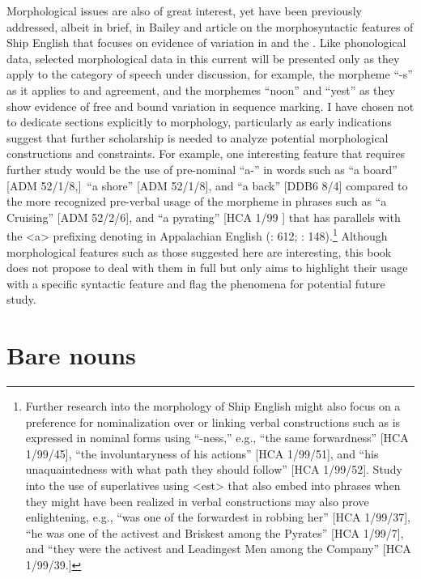 Morphological issues are also of great interest, yet have been previously addressed, albeit in brief, in Bailey and  article on the morphosyntactic features of Ship English that focuses on evidence of variation in  and the . Like phonological data, selected morphological data in this current  will be presented only as they apply to the category of speech under discussion, for example, the morpheme “-s” as it applies to  and   agreement, and the morphemes “noon” and “yest” as they show evidence of free and bound variation in sequence marking. I have chosen not to dedicate sections explicitly to morphology, particularly as early indications suggest that further scholarship is needed to analyze potential morphological constructions and constraints. For example, one interesting feature that requires further study would be the use of pre-nominal “a-” in words such as “a board” [ADM 52/1/8,]~“a shore” [ADM 52/1/8], and “a back” [DDB6 8/4] compared to the more recognized pre-verbal usage of the morpheme in phrases such as “a Cruising” [ADM 52/2/6], and “a pyrating” [HCA 1/99 \citealt{Barbados1733}] that has parallels with the <a> prefixing denoting  in Appalachian English (\citealt{Hickey2004}: 612; \citealt{Montgomery2001}: 148).\footnote{Further research into the morphology of Ship English might also focus on a preference for nominalization over  or linking verbal constructions such as is expressed in nominal forms using “-ness,” e.g., “the same forwardness” [HCA 1/99/45], “the involuntaryness of his actions” [HCA 1/99/51], and “his unaquaintedness with what path they should follow” [HCA 1/99/52]. Study into the use of  superlatives using <est> that also embed into  phrases when they might have been realized in verbal constructions may also prove enlightening, e.g., “was one of the forwardest in robbing her” [HCA 1/99/37], “he was one of the activest and Briskest among the Pyrates” [HCA 1/99/7], and “they were the activest and Leadingest Men among the Company” [HCA 1/99/39.]} Although morphological features such as those suggested here are interesting, this book does not propose to deal with them in full but only aims to highlight their usage with a specific syntactic feature and flag the phenomena for potential future study. 

\section{{Bare nouns}}%

